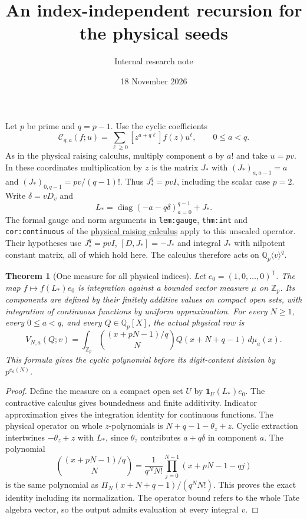 \documentclass[11pt]{article}
\title{An index-independent recursion for the physical seeds}
\author{Internal research note}\date{18 November 2026}
\newtheorem{theorem}{Theorem}\newtheorem{corollary}[theorem]{Corollary}
\begin{document}
\setlength{\emergencystretch}{1em}\maketitle
Let $p$ be prime and $q=p-1$. Use the cyclic coefficients
\[
 \mathcal C_{q,a}(f;u)=\sum_{\ell\ge0}[z^{a+q\ell}]f(z)u^\ell,\qquad
 0\le a<q.
\]
As in the physical raising calculus, multiply component $a$ by
$a!$ and take $u=pv$. In these coordinates multiplication by $z$
is the matrix $J_*$ with $(J_*)_{a,a-1}=a$ and
$(J_*)_{0,q-1}=pv/(q-1)!$. Thus $J_*^q=pvI$, including the
scalar case $p=2$. Write $\delta=vD_v$ and
\[
 L_*=\operatorname{diag}(-a-q\delta)_{a=0}^{q-1}+J_*.
\]
The formal gauge and norm arguments in \texttt{lem:gauge},
\texttt{thm:int} and \texttt{cor:continuous} of the
\href{PHYSICAL_PRIME_RAISING_CALCULUS.tex}{physical raising calculus}
apply to this unscaled operator. Their hypotheses use
$J_*^q=pvI$, $[D,J_*]=-J_*$ and integral $J_*$ with nilpotent
constant matrix, all of which hold here. The calculus therefore acts
on $\mathbb Q_p\langle v\rangle^q$.

\begin{theorem}[One measure for all physical indices]\label{thm:measure}
Let $e_0=(1,0,\ldots,0)^{\mathsf T}$. The map
$f\mapsto f(L_*)e_0$ is integration against a bounded vector measure
$\mu$ on $\mathbb Z_p$. Its components are defined by their finitely
additive values on compact open sets, with integration of continuous
functions by uniform approximation. For every $N\ge1$, every
$0\le a<q$, and every $Q\in\mathbb Q_p[X]$, the actual physical row is
\[
 V_{N,a}(Q;v)=\int_{\mathbb Z_p}
       \binom{(x+pN-1)/q}{N}Q(x+N+q-1)\,d\mu_a(x).
\]
This formula gives the cyclic polynomial before its digit-content
division by $p^{e_a(N)}$.
\end{theorem}
\begin{proof}
Define the measure on a compact open set $U$ by
$\mathbf{1}_U(L_*)e_0$. The contractive calculus gives boundedness
and finite additivity. Indicator approximation gives the integration
identity for continuous functions. The physical operator on whole
$z$-polynomials is $N+q-1-\theta_z+z$.
Cyclic extraction intertwines $-\theta_z+z$ with $L_*$,
since $\theta_z$ contributes $a+q\delta$ in component $a$.
The polynomial
\[
 \binom{(x+pN-1)/q}{N}
    =\frac1{q^NN!}\prod_{j=0}^{N-1}(x+pN-1-qj)
\]
is the same polynomial as $\Pi_N(x+N+q-1)/(q^NN!)$.
This proves the exact identity including its normalization.
The operator bound refers to the whole Tate algebra vector,
so the output admits evaluation at every integral $v$.
\end{proof}
\end{document}
